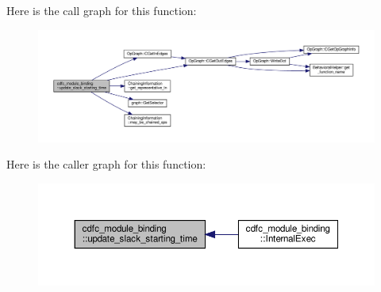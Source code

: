 Here is the call graph for this function\+:
\nopagebreak
\begin{figure}[H]
\begin{center}
\leavevmode
\includegraphics[width=350pt]{d9/dc4/classcdfc__module__binding_a6988dcd248a68abd1ae2ee4982c8f503_cgraph}
\end{center}
\end{figure}
Here is the caller graph for this function\+:
\nopagebreak
\begin{figure}[H]
\begin{center}
\leavevmode
\includegraphics[width=350pt]{d9/dc4/classcdfc__module__binding_a6988dcd248a68abd1ae2ee4982c8f503_icgraph}
\end{center}
\end{figure}
\mbox{\label{classcdfc__module__binding_ae26b6940aebc7b96eff2552c3f9e11b4}} 
